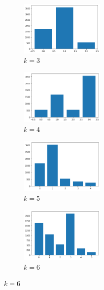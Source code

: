 \begin{figure}[H]
\begin{subfigure}{.5\textwidth}
  \centering
  \includegraphics[width=0.45\textwidth]{imagenes/counter/pm/km3.png}
  \caption{$k=3$}
\end{subfigure}%
\begin{subfigure}{.5\textwidth}
  \centering
  \includegraphics[width=0.45\textwidth]{imagenes/counter/pm/km4.png}
  \caption{$k=4$}
\end{subfigure}
\begin{subfigure}{.5\textwidth}
  \centering
  \includegraphics[width=0.45\textwidth]{imagenes/counter/pm/km5.png}
  \caption{$k=5$}
\end{subfigure}
\begin{subfigure}{.5\textwidth}
  \centering
  \includegraphics[width=0.45\textwidth]{imagenes/counter/pm/km6.png}
  \caption{$k=6$}
\end{subfigure}

\end{figure}
